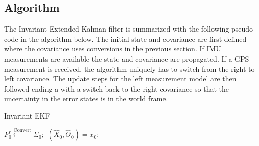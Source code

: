 \subsection{Algorithm}
The Invariant Extended Kalman filter is summarized with the following pseudo code in the algorithm below. The initial state and covariance are first defined where the covariance uses conversions in the previous section. If IMU measurements are available the state and covariance are propagated. If a GPS measurement is received, the algorithm uniquely has to switch from the right to left covariance. The update steps for the left measurement model are then followed ending a with a switch back to the right covariance so that the uncertainty in the error states is in the world frame.

\begin{algorithm}[H]
\caption{Invariant EKF}\label{alg: InEKF}
$P^r_0 \xleftarrow{\text{Convert}} \Sigma_{0};$ 
$(\hat{X}_0, \hat{\Theta}_0 ) = x_0;$ 

\end{algorithm}
